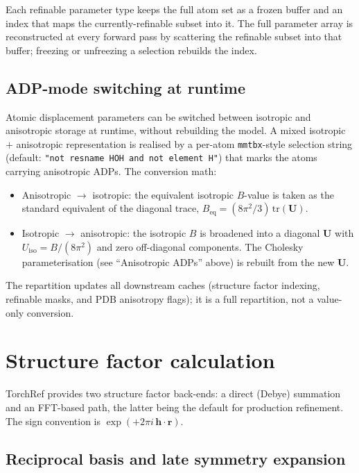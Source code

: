 \documentclass{iucrjournals}
\begin{document}
Each refinable parameter type keeps the full atom set as a frozen buffer and
an index that maps the currently-refinable subset into it.  The full
parameter array is reconstructed at every forward pass by scattering the
refinable subset into that buffer; freezing or unfreezing a selection
rebuilds the index.

\subsection{ADP-mode switching at runtime}\label{sec:adp-mode}

Atomic displacement parameters can be switched between isotropic and
anisotropic storage at runtime, without rebuilding the model.  A mixed
isotropic $+$ anisotropic representation is realised by a per-atom
\texttt{mmtbx}-style selection string (default:
\texttt{"not resname HOH and not element H"}) that marks the atoms
carrying anisotropic ADPs.  The conversion math:
%
\begin{itemize}
\item Anisotropic $\rightarrow$ isotropic: the equivalent isotropic
  $B$-value is taken as the standard equivalent of the diagonal trace,
  $B_\mathrm{eq} = (8\pi^{2}/3)\,\mathrm{tr}(\mathbf{U})$.
\item Isotropic $\rightarrow$ anisotropic: the isotropic $B$ is broadened
  into a diagonal $\mathbf{U}$ with $U_\mathrm{iso} = B/(8\pi^{2})$ and
  zero off-diagonal components.  The Cholesky parameterisation (see
  ``Anisotropic ADPs'' above) is rebuilt from the new $\mathbf{U}$.
\end{itemize}
%
The repartition updates all downstream caches (structure factor indexing,
refinable masks, and PDB anisotropy flags); it is a full repartition, not a
value-only conversion.


\section{Structure factor calculation}

TorchRef provides two structure factor back-ends: a direct (Debye) summation
and an FFT-based path, the latter being the default for production refinement.
The sign convention is $\exp(+2\pi i\,\mathbf{h}\cdot\mathbf{r})$.

\subsection{Reciprocal basis and late symmetry expansion}
\end{document}

